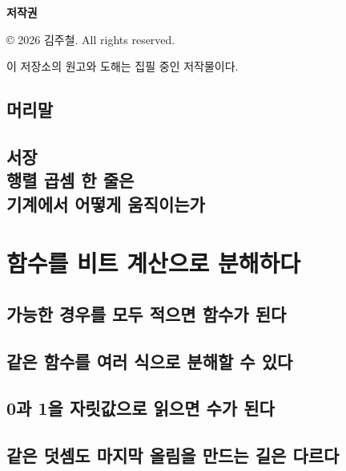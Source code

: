 \documentclass[10pt,openany]{book}
\title{\BookTitle}
\author{\BookAuthor}
\date{}
\begin{document}
\hypersetup{pageanchor=false}

\begin{titlepage}
  \thispagestyle{empty}
  \vspace*{42mm}

  {\sffamily\Huge\bfseries \BookTitle\par}
  \vspace{22mm}
  {\large \BookAuthor\par}

  \vfill
\end{titlepage}

\clearpage
\thispagestyle{empty}
\vspace*{\fill}
{\small\sffamily
\textbf{저작권}\par
© 2026 김주철. All rights reserved.\par
\smallskip
이 저장소의 원고와 도해는 집필 중인 저작물이다.
\par}
\clearpage

\frontmatter
\hypersetup{pageanchor=true}
\tableofcontents

\chapter*{머리말}


\mainmatter

\chapter*{서장\\행렬 곱셈 한 줄은\\기계에서 어떻게 움직이는가}


\part{함수를 비트 계산으로 분해하다}

\chapter{가능한 경우를 모두 적으면 함수가 된다}
\label{chap:ch01-truth-table}


\chapter{같은 함수를 여러 식으로 분해할 수 있다}
\label{chap:ch02-equivalent-decompositions}


\chapter{0과 1을 자릿값으로 읽으면 수가 된다}
\label{chap:ch03-binary-arithmetic}


\chapter{같은 덧셈도 마지막 올림을 만드는 길은 다르다}
\label{chap:ch04-carry-paths}


\backmatter
\printbibliography[heading=bibintoc,title={참고문헌}]
\end{document}
